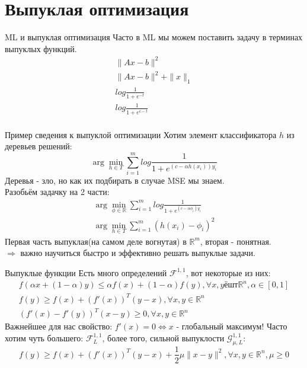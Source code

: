 \documentclass[14pt, fleqn, xcolor={dvipsnames, table}]{beamer}
\begin{document}
\section{Выпуклая оптимизация}

\begin{frame}{ML и выпуклая оптимизация}
Часто в ML мы можем поставить задачу в терминах выпуклых функций.
$$\begin{array}{l}
  \|Ax - b\|^2 \\
  \|Ax - b\|^2 + \|x\|_1 \\
  log\frac{1}{1+e^{-t}} \\
  log\frac{1}{1+e^{c-t}} \\
\end{array}$$
\end{frame}


\begin{frame}{Пример сведения к выпуклой оптимизации}
\small
Хотим элемент классификатора $h$ из деревьев решений:
$$
\arg\min_{h \in T}\sum_{i=1}^mlog\frac{1}{1+e^{(c - \alpha h(x_i))y_i}}
$$
Деревья - зло, но как их подбирать в случае MSE мы знаем. \\
Разобьём задачку на 2 части:
$$\begin{array}{l}
  \arg\min_{\phi \in \mathbb{R}}\sum_{i=1}^mlog\frac{1}{1+e^{(c - \alpha \phi_i)y_i}} \\
  \arg\min_{h \in T}\sum_{i=1}^m(h(x_i) - \phi_i)^2
\end{array}$$
Первая часть выпуклая(на самом деле вогнутая) в $\mathbb{R}^m$, вторая - понятная. \\
$\Rightarrow$ важно научиться быстро и эффективно решать выпуклые задачи.
\end{frame}

\begin{frame}{Выпуклые функции}
\small
Есть много определений $\mathcal{F}^{1,1}$, вот некоторые из них:
$$\begin{array}{l}
  f(\alpha x + (1- \alpha)y) \le \alpha f(x) + (1-\alpha)f(y), \forall x,y ёшт \mathbb{R}^n, \alpha \in [0,1] \\
  f(y) \ge f(x) + (f'(x))^T(y-x), \forall x,y \in \mathbb{R}^n \\
  (f'(x) - f'(y))^T(x-y) \ge 0, \forall x,y \in \mathbb{R}^n 
\end{array}$$
Важнейшее для нас свойство: $f'(x) = 0 \Leftrightarrow x$ - глобальный максимум! Часто хотим чуть большего: $\mathcal{F}_L^{1,1}$, более того, сильной выпуклости $\mathcal{G}_{\mu, L}^{1,1}$:  \\
$$
f(y) \ge f(x) + (f'(x))^T(y-x) + \frac{1}{2}\mu\|x-y\|^2, \forall x,y \in \mathbb{R}^n, \mu \ge 0 
$$

\end{frame}
\end{document}
